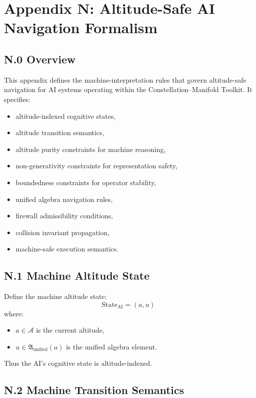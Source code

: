 \appendix
\section*{Appendix N: Altitude-Safe AI Navigation Formalism}

\subsection*{N.0 Overview}

This appendix defines the machine-interpretation rules that govern
altitude-safe navigation for AI systems operating within the
Constellation–Manifold Toolkit.  
It specifies:
\begin{itemize}
    \item altitude-indexed cognitive states,
    \item altitude transition semantics,
    \item altitude purity constraints for machine reasoning,
    \item non-generativity constraints for representation safety,
    \item boundedness constraints for operator stability,
    \item unified algebra navigation rules,
    \item firewall admissibility conditions,
    \item collision invariant propagation,
    \item machine-safe execution semantics.
\end{itemize}

\subsection*{N.1 Machine Altitude State}

Define the machine altitude state:
\[
\mathrm{State}_{\mathrm{AI}} =
(a, u)
\]
where:
\begin{itemize}
    \item $a \in \mathcal{A}$ is the current altitude,
    \item $u \in \mathfrak{A}_{\mathrm{unified}}(a)$ is the unified algebra element.
\end{itemize}

Thus the AI’s cognitive state is altitude-indexed.

\subsection*{N.2 Machine Transition Semantics}

